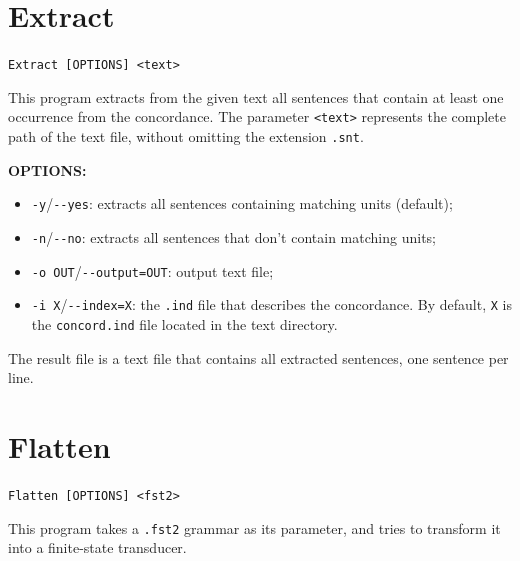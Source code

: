 \section{Extract}
\verb+Extract [OPTIONS] <text>+

\bigskip
\noindent This program extracts from the given text all sentences that
contain at least one occurrence from the concordance. The parameter
\verb+<text>+ represents the complete path of the text file, without 
omitting the extension \verb+.snt+.

\bigskip
\noindent \textbf{OPTIONS:}
\begin{itemize}
  \item \verb+-y+/\verb+--yes+: extracts all sentences containing matching units
  (default);
  \item \verb+-n+/\verb+--no+: extracts all sentences that don't contain
  matching units;
  \item \verb+-o OUT+/\verb+--output=OUT+: output text file;
  \item \verb+-i X+/\verb+--index=X+: the \verb+.ind+ file that describes the
        concordance. By default, \verb+X+ is the \verb+concord.ind+ file located
        in the text directory.
\end{itemize}

\bigskip
\noindent The result file is a text file that contains all extracted sentences, one
sentence per line.







\section{Flatten}
\verb+Flatten [OPTIONS] <fst2>+

\bigskip
\noindent This program takes a \verb+.fst2+ grammar as its parameter, and tries to
transform it into a finite-state transducer. 

